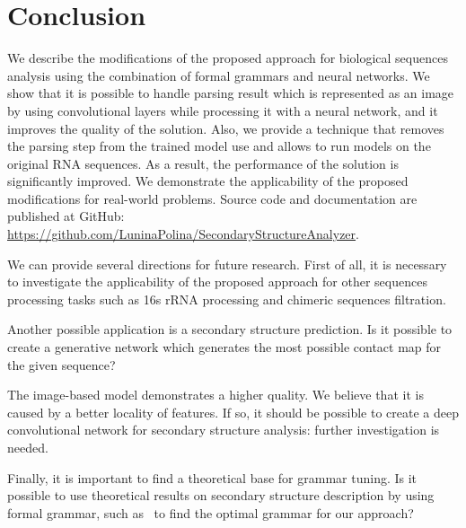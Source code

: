 \documentclass[runningheads]{llncs}
\begin{document}


\section{Conclusion}
We describe the modifications of the proposed approach for biological sequences analysis using the combination of formal grammars and neural networks.
We show that it is possible to handle parsing result which is represented as an image by using convolutional layers while processing it with a neural network, and it improves the quality of the solution.
Also, we provide a technique that removes the parsing step from the trained model use and allows to run models on the original RNA sequences.
As a result, the performance of the solution is significantly improved.
We demonstrate the applicability of the proposed modifications for real-world problems.
Source code and documentation are published at GitHub: \url{https://github.com/LuninaPolina/SecondaryStructureAnalyzer}.

We can provide several directions for future research.
First of all, it is necessary to investigate the applicability of the proposed approach for other sequences processing tasks such as 16s rRNA processing and chimeric sequences filtration.

Another possible application is a secondary structure prediction.
Is it possible to create a generative network which generates the most possible contact map for the given sequence?

The image-based model demonstrates a higher quality.
We believe that it is caused by a better locality of features.
If so, it should be possible to create a deep convolutional network for secondary structure analysis: further investigation is needed.

Finally, it is important to find a theoretical base for grammar tuning.
Is it possible to use theoretical results on secondary structure description by using formal grammar, such as~\cite{MQbioinformatics19} to find the optimal grammar for our approach?
%
%
%


%
\end{document}
